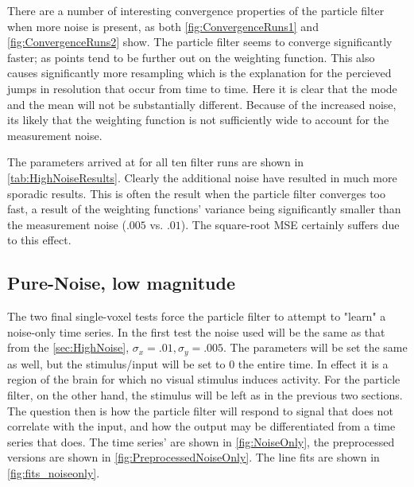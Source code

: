 There are a number of interesting convergence properties of the
particle filter when more noise is present, as both \autoref{fig:ConvergenceRuns1} and
\autoref{fig:ConvergenceRuns2} show. The particle filter seems to converge
significantly faster; as points tend to be further out on the weighting function. This
also causes significantly more resampling which is the explanation for the percieved
jumps in resolution that occur from time to time. Here it is clear that the mode and
the mean will not be substantially different. Because of the increased noise, its likely
that the weighting function is not sufficiently wide to account for the measurement noise.

The parameters arrived at for all ten filter runs are shown in \autoref{tab:HighNoiseResults}.
Clearly the additional noise have resulted in much more sporadic results. This is often the 
result when the particle filter converges too fast, a result of the weighting functions' variance
being significantly smaller than the measurement noise ($.005$ vs. $.01$). The square-root
MSE certainly suffers due to this effect.

\subsection{Pure-Noise, low magnitude}
\label{sec:PureNoiseLowMag}
The two final single-voxel tests force the particle filter to attempt to "learn" a noise-only
time series. In the first test the noise used will be the same as that from the \autoref{sec:HighNoise},
$\sigma_x = .01, \sigma_y = .005$. The parameters will be set the same as well, but the
stimulus/input will be set to 0 the entire time. In effect it is a region of the brain for
which no visual stimulus induces activity. For the particle filter, on the other hand,
the stimulus will be left as in the previous two sections. The question then is how the
particle filter will respond to signal that does not correlate with the input, and how
the output may be differentiated from a time series that does. The time series'
are shown in \autoref{fig:NoiseOnly}, the preprocessed versions are shown in \autoref{fig:PreprocessedNoiseOnly}.
The line fits are shown in \autoref{fig:fits_noiseonly}. 


